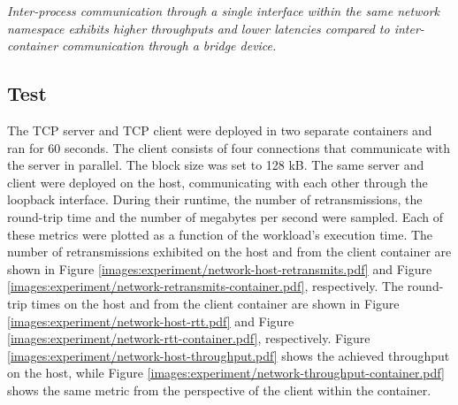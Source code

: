\textit{Inter-process communication through a single interface within the same network namespace 
exhibits higher throughputs and lower latencies compared to inter-container communication through a bridge device.}

\subsection{Test}
The TCP server and TCP client were deployed in two separate containers and ran for 60 seconds. 
The client consists of four connections that communicate with the server in parallel.
The block size was set to 128 kB. The same server and client were deployed on the host, communicating
with each other through the loopback interface. During their runtime, the number of retransmissions, 
the round-trip time and the number of megabytes per second were sampled. Each of these metrics 
were plotted as a function of the workload's execution time.
The number of retransmissions exhibited on the host and from the client container are shown in 
Figure \ref{images:experiment/network-host-retransmits.pdf} and Figure \ref{images:experiment/network-retransmits-container.pdf}, respectively.
The round-trip times on the host and from the client container are shown in Figure \ref{images:experiment/network-host-rtt.pdf}
and Figure \ref{images:experiment/network-rtt-container.pdf}, respectively.
Figure \ref{images:experiment/network-host-throughput.pdf} shows the achieved throughput 
on the host, while Figure \ref{images:experiment/network-throughput-container.pdf} shows the 
same metric from the perspective of the client within the container.

